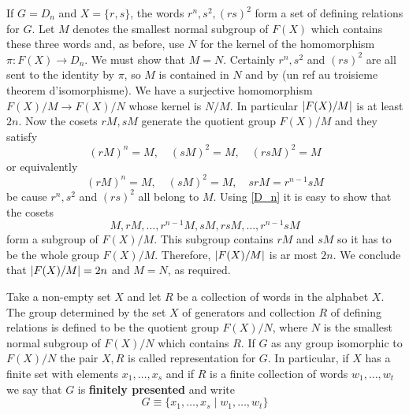 \begin{exemple}
    If $G=D_n$ and $X=\{r,s\}$, the words $r^n,s^2, (rs)^2$ form a set of defining relations for $G$. Let $M$ denotes the smallest normal subgroup of $F(X)$ which contains these three words and, as before, use $N$ for the kernel of the homomorphism $\pi : F(X)\to D_n$. We must show that $M=N$. Certainly  $r^n,s^2$ and $(rs)^2$ are all sent to the identity by $\pi$, so $M$ is contained in $N$ and by (un ref au troisieme theorem d'isomorphisme). We have a surjective homomorphism $F(X)/M\to F(X)/N$ whose kernel is $N/M$. In particular $\left| F(X)/M \right|$ is at least $2n$. Now the cosets $rM,sM$ generate the quotient group $F(X)/M$ and they satisfy
    \begin{equation*}
     (rM)^n=M, \quad (sM)^2=M, \quad (rsM)^2=M
    \end{equation*}
        or equivalently
    \begin{equation}\label{D_n}
     (rM)^n=M, \quad (sM)^2=M, \quad srM=r^{n-1}sM
    \end{equation}
    be cause $r^n,s^2$ and $(rs)^2$ all belong to $M$. Using \ref{D_n} it is easy to show that the cosets
    \begin{equation*}
        M,rM,\dotsc,r^{n-1}M,sM,rsM,\dotsc,r^{n-1}sM
    \end{equation*}
    form a subgroup of $F(X)/M$. This subgroup contains $rM$ and $sM$ so it has to be the whole group $F(X)/M$. Therefore, $\left| F(X)/M \right|$ is ar most $2n$. We conclude that $\left| F(X)/M \right|=2n$ and $M=N$, as required.
\end{exemple}
Take a non-empty set $X$ and let $R$ be a collection of words in the alphabet $X$. The group determined by the set $X$ of generators and collection $R$ of defining relations is defined  to be the quotient group $F(X)/N$, where $N$ is the smallest normal subgroup of $F(X)/N$ which contains $R$. If $G$ as any group isomorphic to $F(X)/N$ the pair $X,R$ is called representation for $G$. In particular, if $X$ has a finite set with elements $x_1,\dotsc,x_s$ and if $R$ is a finite collection of words $w_1,\dotsc,w_t$ we say that $G$ is \textbf{finitely presented} and write
\begin{equation*}
    G\equiv\{x_1,\dotsc,x_s\mid w_1,\dots,w_t\}
\end{equation*}

